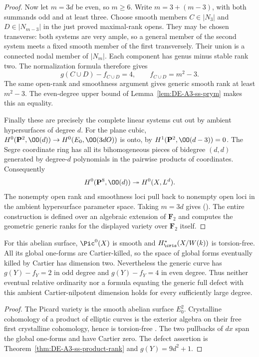 \begin{proof}
Now let $m=3d$ be even, so $m\ge6$.  Write $m=3+(m-3)$, with both
summands odd and at least three.  Choose smooth members
$C\in|N_3|$ and $D\in|N_{m-3}|$ in the just proved maximal-rank opens.
They may be chosen transverse: both systems are very ample, so a general
member of the second system meets a fixed smooth member of the first
transversely.  Their union is a connected nodal member of $|N_m|$.
Each component has genus minus stable rank two.  The normalization
formula therefore gives
\[
 g(C\cup D)-f_{C\cup D}=4,\qquad f_{C\cup D}=m^2-3.
\]
The same open-rank and smoothness argument gives generic smooth rank at
least $m^2-3$.  The even-degree upper bound of
Lemma~\ref{lem:DE-A3-ss-prym} makes this an equality.

Finally these are precisely the complete linear systems cut out by
ambient hypersurfaces of degree $d$.  For the plane cubic,
$H^0(\mathbf P^2,\OO(d))\to H^0(E_0,\OO(3dO))$ is onto, by
$H^1(\mathbf P^2,\OO(d-3))=0$.  The Segre coordinate ring has all its
bihomogeneous pieces of bidegree $(d,d)$ generated by degree-$d$
polynomials in the pairwise products of coordinates.  Consequently
\[
 H^0(\mathbf P^8,\OO(d))\twoheadrightarrow H^0(X,L^d).
\]
The nonempty open rank and smoothness loci pull back to nonempty open
loci in the ambient hypersurface parameter space.  Taking $m=3d$ gives
(\dagger).  The entire construction is defined over an algebraic
extension of $\mathbf F_2$ and computes the geometric generic ranks for
the displayed variety over $\mathbf F_2$ itself.
\end{proof}

\begin{corollary}
\label{cor:DE-A3-ss-product-defect}
For this abelian surface, $\Pic^0(X)$ is smooth and
$H^*_{\cris}(X/W(k))$ is torsion-free.  All its global one-forms are
Cartier-killed, so the space of global forms eventually killed by Cartier
has dimension two.  Nevertheless the generic curve has
$g(Y)-f_Y=2$ in odd degree and $g(Y)-f_Y=4$ in even degree.
Thus neither eventual relative ordinarity nor a formula equating the
generic full defect with this ambient Cartier-nilpotent dimension holds
for every sufficiently large degree.
\end{corollary}
\begin{proof}
The Picard variety is the smooth abelian surface $E_0^2$.  Crystalline
cohomology of a product of elliptic curves is the exterior algebra on
their free first crystalline cohomology, hence is torsion-free
\cite[II, (7.1.1), p.~651]{Illusie1979DRW}.
The two pullbacks of $dx$ span the global one-forms and have Cartier zero.
The defect assertion is Theorem~\ref{thm:DE-A3-ss-product-rank} and
$g(Y)=9d^2+1$.
\end{proof}

